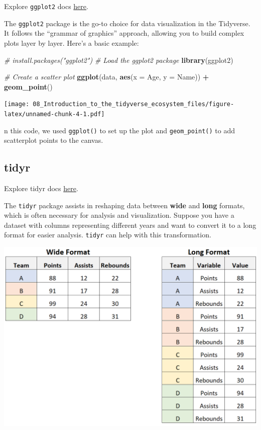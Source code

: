 \documentclass[
]{book}
\newenvironment{Shaded}{\begin{snugshade}}{\end{snugshade}}
\newcommand{\AttributeTok}[1]{\textcolor[rgb]{0.13,0.29,0.53}{#1}}
\newcommand{\CommentTok}[1]{\textcolor[rgb]{0.56,0.35,0.01}{\textit{#1}}}
\newcommand{\FunctionTok}[1]{\textcolor[rgb]{0.13,0.29,0.53}{\textbf{#1}}}
\newcommand{\NormalTok}[1]{#1}
\newcommand{\SpecialCharTok}[1]{\textcolor[rgb]{0.81,0.36,0.00}{\textbf{#1}}}
\begin{document}
Explore \texttt{ggplot2} docs \href{https://ggplot2.tidyverse.org/index.html}{here}.

The \texttt{ggplot2} package is the go-to choice for data visualization in the Tidyverse. It follows the ``grammar of graphics'' approach, allowing you to build complex plots layer by layer. Here's a basic example:

\begin{Shaded}
\begin{Highlighting}[]
\CommentTok{\# install.packages("ggplot2")}
\CommentTok{\# Load the ggplot2 package}
\FunctionTok{library}\NormalTok{(ggplot2)}

\CommentTok{\# Create a scatter plot}
\FunctionTok{ggplot}\NormalTok{(data, }\FunctionTok{aes}\NormalTok{(}\AttributeTok{x =}\NormalTok{ Age, }\AttributeTok{y =}\NormalTok{ Name)) }\SpecialCharTok{+}
  \FunctionTok{geom\_point}\NormalTok{()}
\end{Highlighting}
\end{Shaded}

\texttt{[image: 08\_Introduction\_to\_the\_tidyverse\_ecosystem\_files/figure-latex/unnamed-chunk-4-1.pdf]}

n this code, we used \texttt{ggplot()} to set up the plot and \texttt{geom\_point()} to add scatterplot points to the canvas.

\hypertarget{tidyr}{%
\subsection{tidyr}\label{tidyr}}

Explore tidyr docs \href{https://tidyr.tidyverse.org/index.html}{here}.

The \texttt{tidyr} package assists in reshaping data between \textbf{wide} and \textbf{long} formats, which is often necessary for analysis and visualization. Suppose you have a dataset with columns representing different years and want to convert it to a long format for easier analysis. \texttt{tidyr} can help with this transformation.

\includegraphics[width=1\linewidth]{images/wide}
\end{document}
